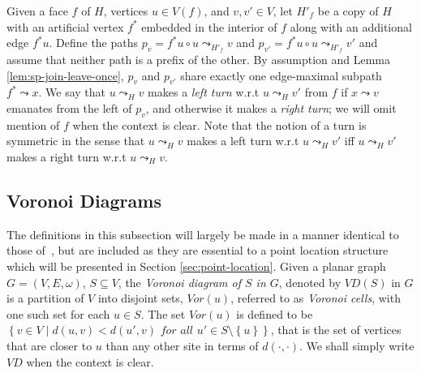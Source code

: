 \documentclass[a4paper,UKenglish,cleveref, autoref, thm-restate]{article}
\begin{document}
Given a face $f$ of $H$, vertices $u \in V(f)$, and $v,v' \in V$, let $H'_f$ be a copy of $H$ with an artificial vertex $f^*$ embedded in the interior of $f$ along with an additional edge $f^*u$. Define the paths $p_v=f^*u \circ u \leadsto_{H'_f} v$ and $p_{v'}=f^*u \circ u \leadsto_{H'_f} v'$ and assume that neither path is a prefix of the other. By assumption and Lemma \ref{lem:sp-join-leave-once}, $p_v$ and $p_{v'}$ share exactly one edge-maximal subpath $f^* \leadsto x$. We say that $u\leadsto_{H} v$ makes a \textit{left turn} w.r.t $u\leadsto_{H} v'$ from $f$ if $x \leadsto v$ emanates from the left of $p_v$, and otherwise it makes a \textit{right turn}; we will omit mention of $f$ when the context is clear. Note that the notion of a turn is symmetric in the sense that $u\leadsto_{H} v$ makes a left turn w.r.t $u\leadsto_{H} v'$ iff $u\leadsto_{H} v'$ makes a right turn w.r.t $u\leadsto_{H} v$.

\subsection{Voronoi Diagrams}
The definitions in this subsection will largely be made in a manner identical to those of~\cite{Gawrychowski2018}, but are included as they are essential to a point location structure which will be presented in Section \ref{sec:point-location}. Given a planar graph $G=(V,E,\omega)$, $S \subseteq V$, the \textit{Voronoi diagram of $S$ in $G$}, denoted by $\textit{VD}(S)$ in $G$ is a partition of $V$ into disjoint sets, $\textit{Vor}(u)$, referred to as \textit{Voronoi cells}, with one such set for each $u \in S$. The set $\textit{Vor}(u)$ is defined to be $\left\{ v \in V \; | \; d(u,v) < d(u',v) \textit{ for all } u' \in S \setminus \left\{ u \right\} \right\}$, that is the set of vertices that are closer to $u$ than any other site in terms of $d(\cdot,\cdot)$. We shall simply write $\textit{VD}$ when the context is clear.
\end{document}
